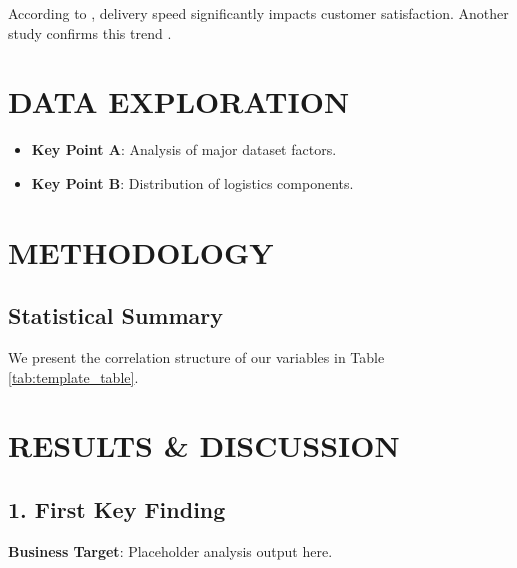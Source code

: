 \documentclass[twocolumn]{article}
\begin{document}
\noindent According to \textcite{nguyen2018impact}, delivery speed significantly impacts customer satisfaction. Another study confirms this trend \parencite{rao2011}.

\section{DATA EXPLORATION}
\lipsum[4]

\begin{itemize}
    \item \textbf{Key Point A}: Analysis of major dataset factors.
    \item \textbf{Key Point B}: Distribution of logistics components.
\end{itemize}

\section{METHODOLOGY}
\lipsum[5]

\subsection{Statistical Summary}
We present the correlation structure of our variables in Table \ref{tab:template_table}. 

\begin{table}[H]
\centering
\caption{Example Table Template}
\label{tab:template_table}
\end{table}

\section{RESULTS \& DISCUSSION}

\subsection{1. First Key Finding}
\textbf{Business Target}: Placeholder analysis output here.
\end{document}

